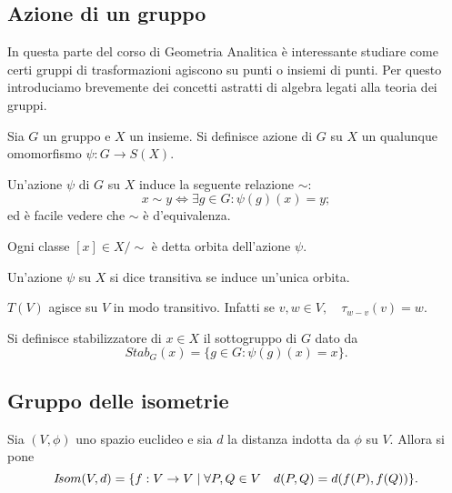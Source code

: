 	\subsection{Azione di un gruppo}

 In questa parte del corso di Geometria Analitica è interessante studiare come certi gruppi di trasformazioni agiscono su punti o insiemi di punti.
 Per questo introduciamo brevemente dei concetti astratti di algebra legati alla teoria dei gruppi.
 
 \begin{definition}
	Sia $G$ un gruppo e $X$ un insieme. Si definisce azione di $G$ su $X$ un qualunque omomorfismo $\psi: G \rightarrow S(X)$.
 \end{definition}
 
 \begin{remark}
	Un'azione $\psi$ di $G$ su $X$ induce la seguente relazione $\sim$:
	\[
		x \sim y \Leftrightarrow \exists g\in G : \psi(g)(x)=y;
	\]
	ed è facile vedere che $\sim$ è d'equivalenza.
 \end{remark}

 \begin{definition}[Orbita]
	Ogni classe $[x]\in X/\!\!\sim$ è detta orbita dell'azione $\psi$.
 \end{definition}
 \begin{definition}
	Un'azione $\psi$ su $X$ si dice transitiva se induce un'unica orbita.
 \end{definition}

 \begin{example}
 $T(V)$ agisce su $V$ in modo transitivo.
 Infatti se $v,w\in V,\quad\tau_{w-v}(v)=w$.
 \end{example}
 
 \begin{definition}[Stabilizzatore]
	Si definisce stabilizzatore di $x\in X$ il sottogruppo di $G$ dato da
	\[
		Stab_G(x) = \{g\in G : \psi(g)(x)=x\}.
	\]
 \end{definition}

 
	\subsection{Gruppo delle isometrie}
 
 Sia $(V,\phi)$ uno spazio euclideo e sia $d$ la distanza indotta da $\phi$ su $V$. Allora si pone
 $$I\!som(V,d)=\{f:V\to V\;|\;\forall P,Q\in V\quad d(P,Q)=d(f(P),f(Q))\}.$$
 
